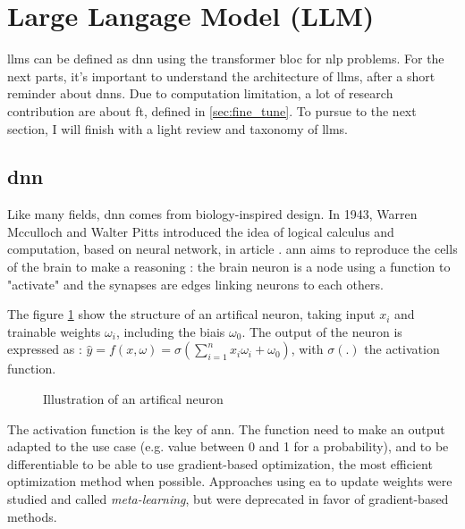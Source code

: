 \section{Large Langage Model (LLM)}
\label{sec:llm}
\glspl{llm} can be defined as \gls{dnn} using the \gls{transformer} bloc for \acrfull{nlp} problems. For the next parts, it's important to understand the architecture of \glspl{llm}, after a short reminder about \glspl{dnn}. Due to computation limitation, a lot of research contribution are about \Gls{ft}, defined in \ref{sec:fine_tune}. To pursue to the next section, I will finish with a light review and taxonomy of \glspl{llm}. 

\subsection{\acrfull{dnn}}
\label{sec:dnn}
Like many fields, \gls{dnn} comes from biology-inspired design. In 1943,  Warren Mcculloch and Walter Pitts introduced the idea of logical calculus and computation, based on neural network, in article \cite{mcculloch_logical_1943}. \acrfull{ann} aims to reproduce the cells of the brain to make a reasoning : the brain neuron is a node using a function to "activate" and the synapses are edges linking neurons to each others.  


The figure \ref{fig:artifical_neuron} show the structure of an artifical neuron, taking input $x_i$ and trainable weights $\omega_i$, including the biais $\omega_0$. The output of the neuron is expressed as : $\hat{y} = f(x,\omega) =  \sigma(\sum_{i=1}^n x_i \omega_i +\omega_0)$, with $\sigma(.)$ the activation function.

\begin{figure}[h]
    \centering
    
    \caption{Illustration of an artifical neuron}
    \label{fig:artifical_neuron}
\end{figure}


The activation function is the key of \acrshort{ann}. The function need to make an output adapted to the use case (e.g. value between 0 and 1 for a probability), and to be differentiable to be able to use gradient-based optimization, the most efficient optimization method when possible. Approaches using \acrfull{ea} to update weights were studied and called \textit{meta-learning}\cite{hospedales_meta-learning_2022}, but were deprecated in favor of gradient-based methods. 

